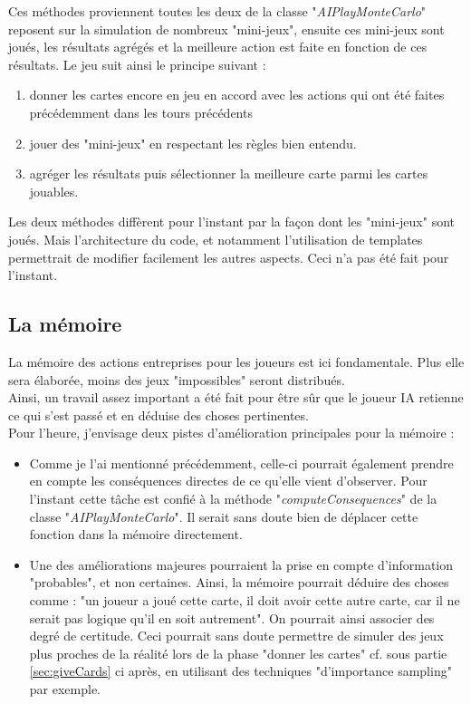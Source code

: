 \documentclass[a4paper,11pt]{article}
\begin{document}
Ces méthodes proviennent toutes les deux de la classe "\textit{AIPlayMonteCarlo}" reposent sur la simulation de nombreux "mini-jeux", ensuite ces mini-jeux sont joués, les résultats agrégés et la meilleure action est faite en fonction de ces résultats. Le jeu suit ainsi le principe suivant :
\begin{enumerate}
\item donner les cartes encore en jeu en accord avec les actions qui ont été faites précédemment dans les tours précédents
\item jouer des "mini-jeux" en respectant les règles bien entendu.
\item agréger les résultats puis sélectionner la meilleure carte parmi les cartes jouables.
\end{enumerate}
Les deux méthodes diffèrent pour l'instant par la façon dont les "mini-jeux" sont joués. Mais l'architecture du code, et notamment l'utilisation de templates permettrait de modifier facilement les autres aspects. Ceci n'a pas été fait pour l'instant.

\subsection{La mémoire}
La mémoire des actions entreprises pour les joueurs est ici fondamentale. Plus elle sera élaborée, moins des jeux "impossibles" seront distribués. \\

Ainsi, un travail assez important a été fait pour être sûr que le joueur IA retienne ce qui s'est passé et en déduise des choses pertinentes. \\

Pour l'heure, j'envisage deux pistes d'amélioration principales pour la mémoire :
\begin{itemize}
\item Comme je l'ai mentionné précédemment, celle-ci pourrait également prendre en compte les conséquences directes de ce qu'elle vient d'observer. Pour l'instant cette tâche est confié à la méthode "\textit{computeConsequences}" de la classe "\textit{AIPlayMonteCarlo}". Il serait sans doute bien de déplacer cette fonction dans la mémoire directement.
\item Une des améliorations majeures pourraient la prise en compte d'information "probables", et non certaines. Ainsi, la mémoire pourrait déduire des choses comme : "un joueur a joué cette carte, il doit avoir cette autre carte, car il ne serait pas logique qu'il en soit autrement". On pourrait ainsi associer des degré de certitude. Ceci pourrait sans doute permettre de simuler des jeux plus proches de la réalité lors de la phase "donner les cartes" cf. sous partie \ref{sec:giveCards} ci après, en utilisant des techniques "d'importance sampling" par exemple.
\end{itemize}
\end{document}

